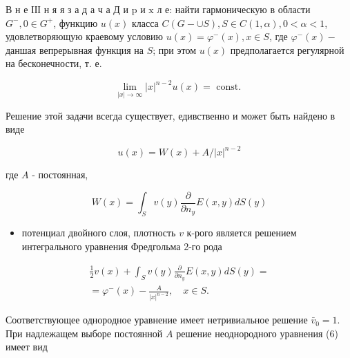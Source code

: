 \documentclass[10pt]{article}
\begin{document}
В н е ІІІ н я я з а д а ч а Д и $\mathrm{p}$ и $\mathrm{x}$ л е: найти гармоническую в области $G^{-}, 0 \in G^{+}$, функцию $u(x)$ класса $C(G-\cup S), S \in C(1, \alpha), 0<\alpha<1$, удовлетворяющую краевому условию $u(x)=\varphi^{-}(x), x \in S$, где $\varphi^{-}(x)-$ даншая вепрерывная функция на $S$; при этом $u(x)$ предполагается регулярной на бесконечности, т. е.



\[

\lim _{|x| \rightarrow \infty}|x|^{n-2} u(x)=\text { const. }

\]



Решение этой задачи всегда существует, едивственно и может быть найдено в виде



\[

u(x)=W(x)+A /|x|^{n-2}

\]



где $A$ - постоянная,



\[

W(x)=\int_{S} v(y) \frac{\partial}{\partial n_{y}} E(x, y) d S(y)

\]



\begin{itemize}

  \item потенциал двойного слоя, плотность $v$ к-рого является решением интегрального уравнения Фредгольма 2-го рода

\end{itemize}



\[

\begin{gathered}

\frac{1}{2} v(x)+\int_{S} v(y) \frac{\partial}{\partial n_{y}} E(x, y) d S(y)= \\

=\varphi^{-}(x)-\frac{A}{|x|^{n-2}}, \quad x \in S .

\end{gathered}

\]



Соответствующее однородное уравнение имеет нетривиальное решение $\bar{v}_{0}=1$. При надлежащем выборе постоянной $A$ решение неоднородного уравнения (6) имеет вид
\end{document}
